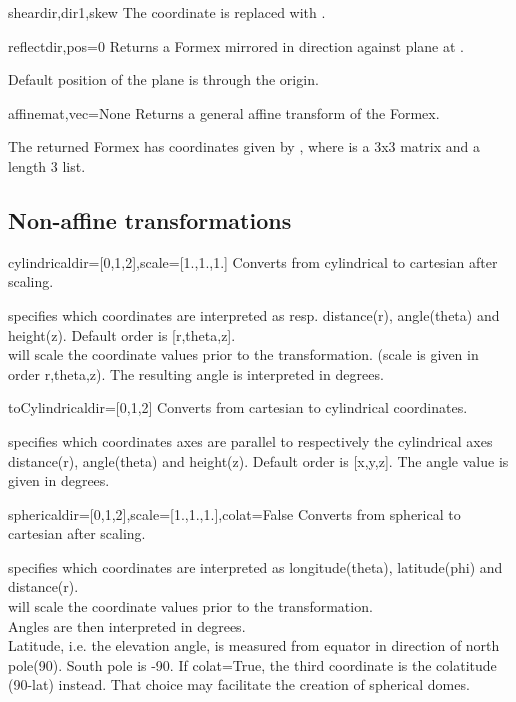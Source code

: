 {{\begin{methoddesc}{shear}{dir,dir1,skew}
The coordinate  is replaced with .
\end{methoddesc}

\begin{methoddesc}{reflect}{dir,pos=0}
Returns a Formex mirrored in direction  against plane at .

Default position of the plane is through the origin.
\end{methoddesc}

\begin{methoddesc}{affine}{mat,vec=None}
Returns a general affine transform of the Formex.

The returned Formex has coordinates given by , where  is a 3x3 matrix and  a length 3 list.
\end{methoddesc}


\subsection{Non-affine transformations}

\begin{methoddesc}{cylindrical}{dir=[0,1,2],scale=[1.,1.,1.]}
Converts from cylindrical to cartesian after scaling.

 specifies which coordinates are interpreted as resp. distance(r), angle(theta) and height(z). Default order is [r,theta,z].\\
 will scale the coordinate values prior to the transformation. (scale is given in order r,theta,z). The resulting angle is interpreted in degrees.
\end{methoddesc}


\begin{methoddesc}{toCylindrical}{dir=[0,1,2]}
Converts from cartesian to cylindrical coordinates.

 specifies which coordinates axes are parallel to respectively the cylindrical axes distance(r), angle(theta) and height(z). Default order is [x,y,z]. The angle value is given in degrees.
\end{methoddesc}

\begin{methoddesc}{spherical}{dir=[0,1,2],scale=[1.,1.,1.],colat=False}
Converts from spherical to cartesian after scaling.

 specifies which coordinates are interpreted as longitude(theta), latitude(phi) and distance(r).\\
 will scale the coordinate values prior to the transformation.\\
Angles are then interpreted in degrees.\\
Latitude, i.e. the elevation angle, is measured from equator in
direction of north pole(90). South pole is -90.
If colat=True, the third coordinate is the colatitude (90-lat) instead.
That choice may facilitate the creation of spherical domes.
\end{methoddesc}

}}
